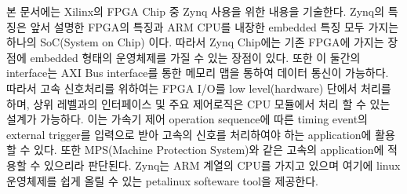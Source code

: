 \documentclass[11pt
  , a4paper
  , article
  , oneside
]{memoir}
\begin{document}
본 문서에는 Xilinx의 FPGA Chip 중 Zynq 사용을 위한 내용을 기술한다. Zynq의 특징은 앞서 설명한 FPGA의 특징과 ARM CPU를 내장한 embedded 특징 모두 가지는 하나의 SoC(System on Chip) 이다.  따라서 Zynq Chip에는 기존 FPGA에 가지는 장점에 embedded 형태의 운영체제를 가질 수 있는 장점이 있다. 또한 이 둘간의 interface는 AXI Bus interface를 통한 메모리 맵을 통하여 데이터 통신이 가능하다. 따라서 고속 신호처리를 위하여는 FPGA I/O를 low level(hardware) 단에서 처리를 하며, 상위 레벨과의 인터페이스 및 주요 제어로직은 CPU 모듈에서 처리 할 수 있는 설계가 가능하다. 이는 가속기 제어 operation sequence에 따른 timing event의 external trigger를 입력으로 받아 고속의 신호를 처리하여야 하는 application에 활용 할 수 있다. 또한 MPS(Machine Protection System)와 같은 고속의 application에 적용할 수 있으리라 판단된다.
Zynq는 ARM 계열의 CPU를 가지고 있으며 여기에 linux 운영체제를 쉽게 올릴 수 있는 petalinux softeware tool을 제공한다. 
\end{document}
